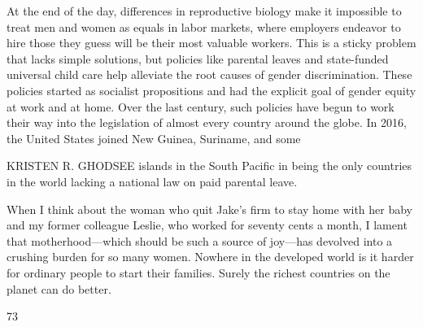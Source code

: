  \par 
At the end of the day, differences in reproductive biology make it impossible to treat men and women as equals in labor markets, where employers endeavor to hire those they guess will be their most valuable workers. This is a sticky problem that lacks simple solutions, but policies like parental leaves and state-funded universal child care help alleviate the root causes of gender discrimination. These policies started as socialist propositions and had the explicit goal of gender equity at work and at home. Over the last century, such policies have begun to work their way into the legislation of almost every country around the globe. In 2016, the United States joined New Guinea, Suriname, and some
 \par 
KRISTEN R. GHODSEE islands in the South Pacific in being the only countries in the world lacking a national law on paid parental leave.
 \par 
When I think about the woman who quit Jake’s firm to stay home with her baby and my former colleague Leslie, who worked for seventy cents a month, I lament that motherhood—which should be such a source of joy—has devolved into a crushing burden for so many women. Nowhere in the developed world is it harder for ordinary people to start their families. Surely the richest countries on the planet can do better.
 \par 
73
 \par 
